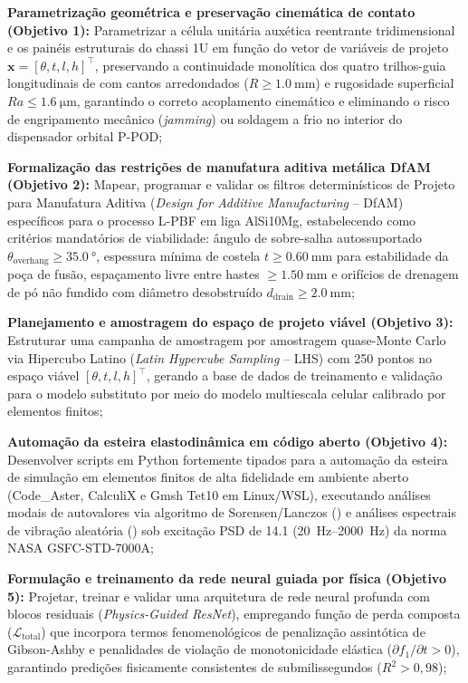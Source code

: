 \begin{alineas}
  \item \textbf{Parametrização geométrica e preservação cinemática de contato (Objetivo 1):} Parametrizar a célula unitária auxética reentrante tridimensional e os painéis estruturais do chassi 1U em função do vetor de variáveis de projeto $\mathbf{x} = [\theta, t, l, h]^\top$, preservando a continuidade monolítica dos quatro trilhos-guia longitudinais de \rail{} com cantos arredondados ($R \ge \SI{1.0}{\milli\metre}$) e rugosidade superficial $Ra \le \SI{1.6}{\micro\metre}$, garantindo o correto acoplamento cinemático e eliminando o risco de engripamento mecânico (\textit{jamming}) ou soldagem a frio no interior do dispensador orbital P-POD;
  \item \textbf{Formalização das restrições de manufatura aditiva metálica DfAM (Objetivo 2):} Mapear, programar e validar os filtros determinísticos de Projeto para Manufatura Aditiva (\textit{Design for Additive Manufacturing} -- DfAM) específicos para o processo L-PBF em liga AlSi10Mg, estabelecendo como critérios mandatórios de viabilidade: ângulo de sobre-salha autossuportado $\theta_{\text{overhang}} \ge \SI{35.0}{\degree}$, espessura mínima de costela $t \ge \SI{0.60}{\milli\metre}$ para estabilidade da poça de fusão, espaçamento livre entre hastes $\ge \SI{1.50}{\milli\metre}$ e orifícios de drenagem de pó não fundido com diâmetro desobstruído $d_{\text{drain}} \ge \SI{2.0}{\milli\metre}$;
  \item \textbf{Planejamento e amostragem do espaço de projeto viável (Objetivo 3):} Estruturar uma campanha de amostragem por amostragem quase-Monte Carlo via Hipercubo Latino (\textit{Latin Hypercube Sampling} -- LHS) com 250 pontos no espaço viável $[\theta, t, l, h]^\top$, gerando a base de dados de treinamento e validação para o modelo substituto por meio do modelo multiescala celular calibrado por elementos finitos;
  \item \textbf{Automação da esteira elastodinâmica em código aberto (Objetivo 4):} Desenvolver scripts em Python fortemente tipados para a automação da esteira de simulação em elementos finitos de alta fidelidade em ambiente aberto (Code\_Aster, CalculiX e Gmsh Tet10 em Linux/WSL), executando análises modais de autovalores via algoritmo de Sorensen/Lanczos () e análises espectrais de vibração aleatória () sob excitação PSD de \SI{14.1}{\Grms} (\SIrange{20}{2000}{\hertz}) da norma NASA GSFC-STD-7000A;
  \item \textbf{Formulação e treinamento da rede neural guiada por física (Objetivo 5):} Projetar, treinar e validar uma arquitetura de rede neural profunda com blocos residuais (\textit{Physics-Guided ResNet}), empregando função de perda composta ($\mathcal{L}_{\text{total}}$) que incorpora termos fenomenológicos de penalização assintótica de Gibson-Ashby e penalidades de violação de monotonicidade elástica ($\partial f_1 / \partial t > 0$), garantindo predições fisicamente consistentes de submilissegundos ($R^2 > 0{,}98$);

\end{alineas}
